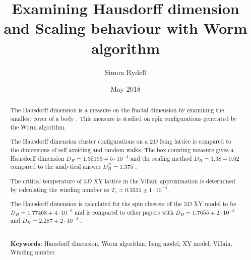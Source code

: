 \documentclass[nocoverpage,swedish,g5paper]{thesis}
\title{Examining Hausdorff dimension and Scaling behaviour with Worm algorithm}
\author{Simon Rydell}
\date{May 2018}
\begin{document}

\begin{abstract}

The Hausdorff dimension is a measure on the fractal dimension by examining the smallest cover of a body \cite{Heinonen:HausdorffDimMath}. This measure is studied on spin configurations generated by the Worm algorithm.

The Hausdorff dimension cluster configurations on a $2D$ Ising lattice is compared to the dimensions of self avoiding and random walks. The box counting measure \cite{strogatz:dynamics_chaos} gives a Hausdorff dimension $D_H = 1.35193 \pm 5 \cdot 10^{-4}$ and the scaling method \cite{Hove:hausdorff_crit_fluctuations} $D_H = 1.38 \pm 0.02$ compared to the analytical answer $D_H^{G} = 1.375$ \cite{Duplantier:GeoHausdorff}.

The critical temperature of $3D$ XY lattice in the Villain approximation is determined by calculating the winding number as $T_c = 0.3331 \pm 1 \cdot 10^{-4}$.

The Hausdorff dimension is calculated for the spin clusters of the $3D$ XY model to be $D_H = 1.77468 \pm 4 \cdot 10^{-6}$ and is compared to other papers with $D_H = 1.7655 \pm 2 \cdot 10^{-3}$ \cite{Prokofev:comment_on_hove_hausdorff_crit_fluct} and $D_H = 2.287 \pm 2 \cdot 10^{-3}$ \cite{Hove:hausdorff_crit_fluctuations}.
\\ \noindent \strut \\
\textbf{Keywords:} Hausdorff dimension, Worm algorithm, Ising model, XY model, Villain, Winding number

\newpage




\end{abstract}
\end{document}
